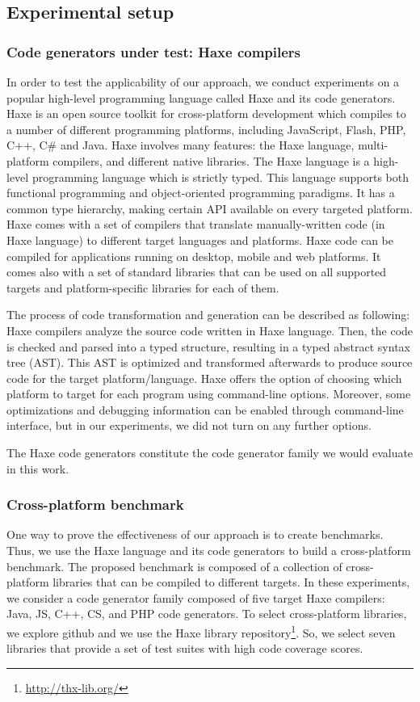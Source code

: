 \subsection{Experimental setup}
\subsubsection{Code generators under test: Haxe compilers}
In order to test the applicability of our approach, we conduct experiments on a popular high-level programming language called Haxe and its code generators. Haxe is an open source toolkit for cross-platform development which compiles to a number of different programming platforms, including JavaScript, Flash, PHP, C++, C\# and Java. Haxe involves many features: the Haxe language, multi-platform compilers, and different native libraries. 
The Haxe language is a high-level programming language which is strictly typed. This language supports both functional programming and object-oriented programming paradigms. It has a common type hierarchy, making certain API available on every targeted platform.
Haxe comes with a set of compilers that translate manually-written code (in Haxe language) to different target languages and platforms. 
Haxe code can be compiled for applications running on desktop, mobile and web platforms. It comes also with a set of standard libraries that can be used on all supported targets and platform-specific libraries for each of them.

The process of code transformation and generation can be described as following: Haxe compilers analyze the source code written in Haxe language. Then, the code is checked and parsed into a typed structure, resulting in a typed abstract syntax tree (AST). This AST is optimized and transformed afterwards to produce source code for the target platform/language.
Haxe offers the option of choosing which platform to target for each program using command-line options. Moreover, some optimizations and debugging information can be enabled through command-line interface, but in our experiments, we did not turn on any further options. 

The Haxe code generators constitute the code generator family we would evaluate in this work.

\subsubsection{Cross-platform benchmark}
One way to prove the effectiveness of our approach is to create benchmarks. Thus, we use the Haxe language and its code generators to build a cross-platform benchmark. The proposed benchmark is composed of a collection of cross-platform libraries that can be compiled to different targets. In these experiments, we consider a code generator family composed of five target Haxe compilers: Java, JS, C++, CS, and PHP code generators. To select cross-platform libraries, we explore github and we use the Haxe library repository\footnote{\url{http://thx-lib.org/}}. So, we select seven libraries that provide a set of test suites with high code coverage scores. 

